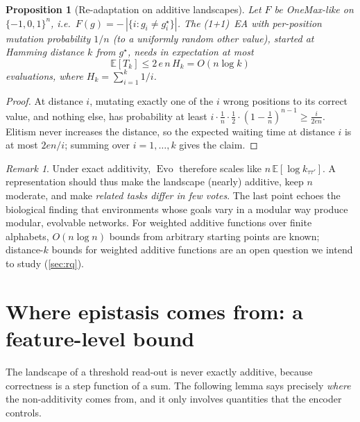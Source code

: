 \documentclass[11pt,a4paper]{article}
\theoremstyle{definition}
\theoremstyle{plain}
\newtheorem{proposition}[definition]{Proposition}
\theoremstyle{remark}
\newtheorem{remark}[definition]{Remark}
\newcommand{\E}{\mathbb{E}}
\newcommand{\Evo}{\operatorname{Evo}}
\begin{document}
\begin{proposition}[Re-adaptation on additive landscapes]
\label{prop:reopt}
Let $F$ be OneMax-like on $\{-1,0,1\}^n$, i.e.\ $F(g) = -\,|\{i: g_i\neq g^\star_i\}|$. The (1+1)~EA with per-position mutation probability $1/n$ (to a uniformly random other value), started at Hamming distance $k$ from $g^\star$, needs in expectation at most
\[
\E[T_k] \le 2\,e\,n\,H_k = O(n\log k)
\]
evaluations, where $H_k=\sum_{i=1}^k 1/i$.
\end{proposition}
\begin{proof}
At distance $i$, mutating exactly one of the $i$ wrong positions to its correct value, and nothing else, has probability at least $i\cdot\frac1n\cdot\frac12\cdot(1-\frac1n)^{n-1}\ge\frac{i}{2en}$. Elitism never increases the distance, so the expected waiting time at distance $i$ is at most $2en/i$; summing over $i=1,\dots,k$ gives the claim.
\end{proof}

\begin{remark}
Under exact additivity, $\Evo$ therefore scales like $n\,\E[\log k_{\tau\tau'}]$. A representation should thus make the landscape (nearly) additive, keep $n$ moderate, and make \emph{related tasks differ in few votes}. The last point echoes the biological finding that environments whose goals vary in a modular way produce modular, evolvable networks. For weighted additive functions over finite alphabets, $O(n\log n)$ bounds from arbitrary starting points are known; distance-$k$ bounds for weighted additive functions are an open question we intend to study (\cref{sec:rq}).
\end{remark}

\section{Where epistasis comes from: a feature-level bound}
\label{sec:theory}

The landscape of a threshold read-out is never exactly additive, because correctness is a step function of a sum. The following lemma says precisely \emph{where} the non-additivity comes from, and it only involves quantities that the encoder controls.
\end{document}
